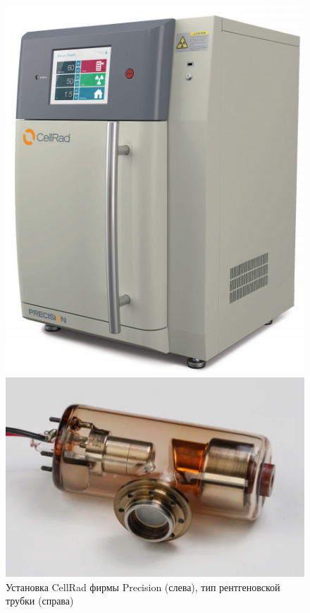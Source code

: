 \begin{figure}[!htb]
\begin{minipage}{0.5\linewidth}
\center
\includegraphics[width=0.9\linewidth]{img/CellRad}
\end{minipage}
\begin{minipage}{0.5\linewidth}
\center
\includegraphics[width=1\linewidth]{img/XRayTube}
\end{minipage}
\vspace{5mm}
\caption{Установка CellRad фирмы Precision (слева), тип рентгеновской трубки (справа)}
\label{img:CellRad}
\end{figure}


